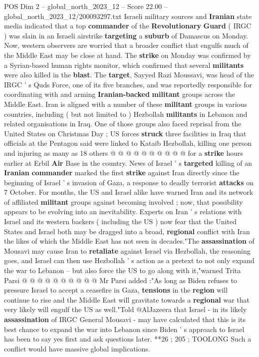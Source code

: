 \begin{textsample}{POS Dim 2 – global\_north\_2023\_12 – Score 22.00 – global\_north\_2023\_12/200093297.txt}  \label{ex:f2_pos_237}
Israeli military sources and \textbf{Iranian} state media indicated that a top \textbf{commander} of the \textbf{Revolutionary} \textbf{Guard} ( IRGC ) was slain in an Israeli airstrike \textbf{targeting} a \textbf{suburb} of Damascus on Monday.
Now, western observers are worried that a broader conflict that engulfs much of the Middle East may be close at hand.
The \textbf{strike} on Monday was confirmed by a Syrian-based human rights monitor, which confirmed that several \textbf{militants} were also killed in the \textbf{blast}.
The \textbf{target}, Sayyed Razi Moussavi, was head of the IRGC ' s Quds Force, one of its five branches, and was reportedly responsible for coordinating with and arming \textbf{Iranian-backed} \textbf{militant} groups across the Middle East.
Iran is aligned with a number of these \textbf{militant} groups in various countries, including ( but not limited to ) Hezbollah \textbf{militants} in Lebanon and related organisations in Iraq.
One of those groups also faced reprisal from the United States on Christmas Day ; US forces \textbf{struck} three facilities in Iraq that officials at the Pentagon said were linked to Kataib Hezbollah, killing one person and injuring as many as 18 others @ @ @ @ @ @ @ @ @ @ for a \textbf{strike} hours earlier at Erbil \textbf{Air} Base in the country.
News of Israel ' s \textbf{targeted} killing of an \textbf{Iranian} \textbf{commander} marked the first \textbf{strike} against Iran directly since the beginning of Israel ' s invasion of Gaza, a response to deadly terrorist \textbf{attacks} on 7 October.
For months, the US and Israel alike have warned Iran and its network of affiliated \textbf{militant} groups against becoming involved ; now, that possibility appears to be evolving into an inevitability.
Experts on Iran ' s relations with Israel and its western backers ( including the US ) now fear that the United States and Israel both may be dragged into a broad, \textbf{regional} conflict with Iran the likes of which the Middle East has not seen in decades."The \textbf{assassination} of Mousavi may cause Iran to \textbf{retaliate} against Israel via Hezbollah, the reasoning goes, and Israel can then use Hezbollah ' s action as a pretext to not only expand the war to Lebanon -- but also force the US to go along with it,"warned Trita Parsi @ @ @ @ @ @ @ @ @ @ Mr Parsi added :"As long as Biden refuses to pressure Israel to accept a ceasefire in Gaza, \textbf{tensions} in the \textbf{region} will continue to rise and the Middle East will gravitate towards a \textbf{regional} war that very likely will engulf the US as well."Told @AlJazeera that Israel - in its likely \textbf{assassination} of IRGC General Mousavi - may have calculated that this is its best chance to expand the war into Lebanon since Biden ' s approach to Israel has been to say yes first and ask questions later. **26 ; 205 ; TOOLONG Such a conflict would have massive global implications.

\end{textsample}
